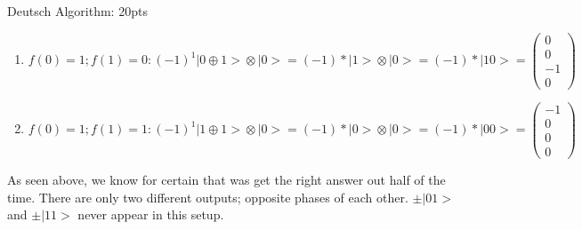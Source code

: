 \documentclass[12pt]{article}
\makeatletter
\newcommand{\<}{\langle}
\renewcommand{\>}{\rangle}
\newenvironment{problem}{\@startsection
       {section}
       {1}
       {-.2em}
       {-3.5ex plus -1ex minus -.2ex}
       {2.3ex plus .2ex}
       {\pagebreak[3]
       \large\bf\noindent{Problem }
       }
       }
       {%
       \begin{center}\large\bf \end{center}}
\def\ket#1{\big|{#1}\big>}
\makeatother
\begin{document}
\begin{problem}{Deutsch Algorithm: 20pts}
\begin{enumerate}
\item $f(0) = 1 ; f(1) = 0 : (-1)^1\ket{0\oplus 1} \otimes \ket{0} = (-1)*\ket{1} \otimes \ket{0} = (-1)*\ket{10} = \left(\begin{matrix}0\\0\\-1\\0\end{matrix} \right)$
\item $f(0) = 1 ; f(1) = 1 : (-1)^1\ket{1\oplus 1} \otimes \ket{0} = (-1)*\ket{0} \otimes \ket{0}  = (-1)*\ket{00} = \left(\begin{matrix}-1\\0\\0\\0\end{matrix} \right)$
\end{enumerate}
As seen above, we know for certain that was get the right answer out half of the time. There are only two different outputs; opposite phases of each other. $\pm\ket{01}$ and $\pm\ket{11}$ never appear in this setup.
\end{problem}
\newpage
\end{document}
